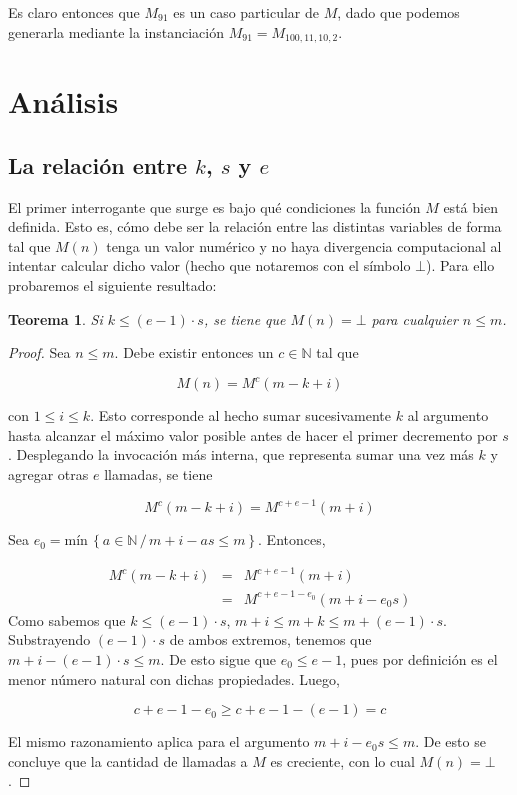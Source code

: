 \documentclass[a4paper,10pt]{article}
\newtheorem{teo}{Teorema}
\newcommand{\Mi}[2]{\ensuremath{M^{#2}(#1)}}
\newcommand{\Nat}{\ensuremath{\mathbb{N}}}
\begin{document}
Es claro entonces que $M_{91}$ es un caso particular de $M$, dado que podemos generarla mediante la instanciaci\'on
$M_{91} = M_{100,11,10,2}$.

\section{An\'alisis}

\subsection{La relaci\'on entre $k$, $s$ y $e$}

El primer interrogante que surge es bajo qu\'e condiciones la funci\'on $M$ est\'a bien definida. Esto es, c\'omo debe
ser la relaci\'on entre las distintas variables de forma tal que $M(n)$ tenga un valor num\'erico y no haya divergencia
computacional al intentar calcular dicho valor (hecho que notaremos con el s\'imbolo $\bot$).
Para ello probaremos el siguiente resultado:

\begin{teo}
Si $k \leq (e - 1) \cdot s$, se tiene que $M(n) = \bot$ para cualquier $n \leq m$.
\end{teo}

\begin{proof}
Sea $n \leq m$. Debe existir entonces un $c \in \Nat$ tal que 

$$M(n) = \Mi{m - k + i}{c}$$

con $1 \leq i \leq k$. Esto corresponde al hecho sumar sucesivamente $k$ al argumento hasta alcanzar el m\'aximo
valor posible antes de hacer el primer decremento por $s$. Desplegando la invocaci\'on m\'as interna, que 
representa sumar una vez m\'as $k$ y agregar otras $e$ llamadas, se tiene

$$\Mi{m - k + i}{c} = \Mi{m + i}{c + e - 1}$$

Sea $e_0 = \text{m\'in} \, \left\{ a \in \Nat \, / \, m + i - as \leq m \right\}$. Entonces,

\begin{eqnarray*}
\Mi{m - k + i}{c} &=& \Mi{m + i}{c + e - 1} \\
                  &=& \Mi{m + i - e_0 s}{c + e - 1 - e_0}
\end{eqnarray*}
Como sabemos que $k \leq (e-1) \cdot s$, $m + i \leq m + k \leq m + (e-1) \cdot s$. Substrayendo $(e-1)\cdot s$ de
ambos extremos, tenemos que $m + i - (e-1)\cdot s \leq m$. De esto sigue que $e_0 \leq e-1$, pues por
definici\'on es el menor n\'umero natural con dichas propiedades. Luego,

$$c + e - 1 - e_0 \geq c + e - 1 - (e-1) = c$$

El mismo razonamiento aplica para el argumento $m + i - e_0 s \leq m$. De esto se concluye que la cantidad de 
llamadas a $M$ es creciente, con lo cual $M(n) = \bot$.
\end{proof}
\end{document}

